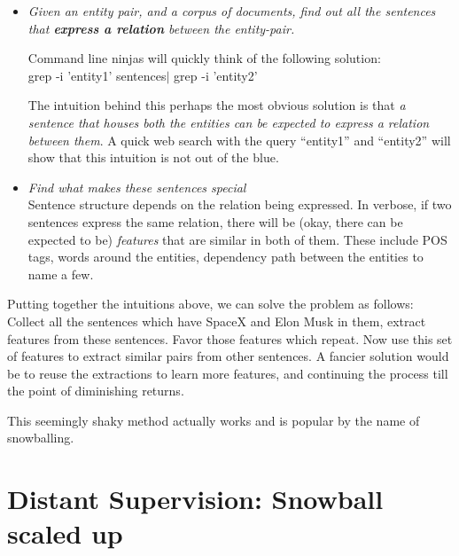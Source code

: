 \documentclass[a4paper,10pt]{article}
\begin{document}
\begin{itemize}
 
\item \emph{Given an entity pair, and a corpus of documents, find out all the sentences that
\textbf{express a relation} between the entity-pair.}

Command line ninjas will quickly think of the following solution:\\
grep -i 'entity1' sentences$\vert$ grep -i 'entity2'

The intuition behind this perhaps the most obvious solution is that \emph{a sentence
that houses both the entities can be expected to express a relation between them}.
A quick web search with the query ``entity1'' and ``entity2'' will show that this 
intuition is not out of the blue.

\item \emph{Find what makes these sentences special} \\
Sentence structure depends on the relation being expressed.
In verbose, if two sentences express the same relation, there will be (okay, there can be expected to be)
 \emph{features} that are similar in both of them. These include POS tags, words around the entities,
dependency path between the entities to name a few.

\end{itemize}
Putting together the intuitions above, we can solve the problem as follows:
Collect all the sentences which have SpaceX and Elon Musk in them, extract features 
from these sentences. Favor those features which repeat.
Now use this set of features to extract similar pairs from other sentences.
A fancier solution would be to reuse the extractions to learn more features, and continuing the process 
till the point of diminishing returns.

This seemingly shaky method actually works \cite{snowball} and is popular by the name of snowballing.

\section{Distant Supervision: Snowball scaled up}
\label{ds}
\end{document}
